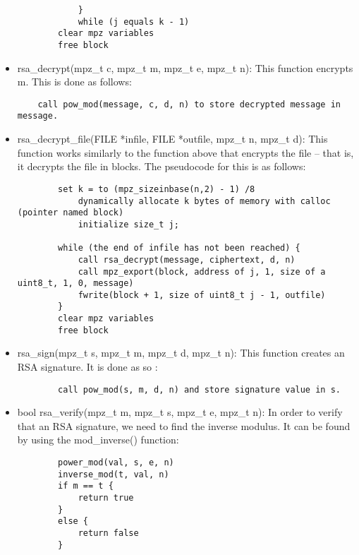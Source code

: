 \documentclass[11pt]{article}
\begin{document}
\begin{itemize}
\begin{verbatim}
            }
            while (j equals k - 1)
	    clear mpz variables
	    free block
	    \end{verbatim}
    \item rsa\_decrypt(mpz\_t c, mpz\_t m, mpz\_t e, mpz\_t n): This function encrypts m. This is done as follows:
    \begin{verbatim}
    call pow_mod(message, c, d, n) to store decrypted message in message.
    \end{verbatim}
    \item rsa\_decrypt\_file(FILE *infile, FILE *outfile, mpz\_t n, mpz\_t d): This function works similarly to the function above that encrypts the file -- that is,
	    it decrypts the file in blocks. The pseudocode for this is as follows:
	    \begin{verbatim}
	    set k = to (mpz_sizeinbase(n,2) - 1) /8
            dynamically allocate k bytes of memory with calloc (pointer named block)
            initialize size_t j;

	    while (the end of infile has not been reached) {
		    call rsa_decrypt(message, ciphertext, d, n)
		    call mpz_export(block, address of j, 1, size of a uint8_t, 1, 0, message)
		    fwrite(block + 1, size of uint8_t j - 1, outfile)
	    }
	    clear mpz variables
	    free block
	    \end{verbatim}
    \item rsa\_sign(mpz\_t s, mpz\_t m, mpz\_t d, mpz\_t n): This function creates an RSA signature. It is done as so :
    \begin{verbatim}
        call pow_mod(s, m, d, n) and store signature value in s.
    \end{verbatim}
    \item bool rsa\_verify(mpz\_t m, mpz\_t s, mpz\_t e, mpz\_t n): In order to verify that an RSA signature, we need to find the inverse modulus. It can be found by using the mod\_inverse() function:
\begin{verbatim}
        power_mod(val, s, e, n)
        inverse_mod(t, val, n)
        if m == t {
            return true
        }
        else {
            return false
        }
\end{verbatim}
\end{itemize}
\end{document}
